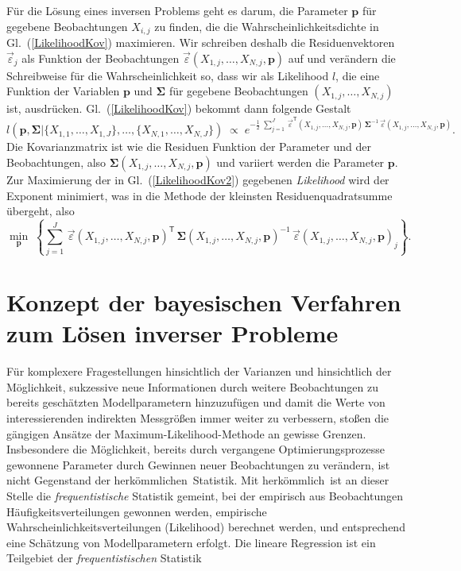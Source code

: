 Für die Lösung eines inversen Problems geht es darum, die Parameter $\mathbf{p}$
für gegebene Beobachtungen $X_{i,j}$ zu finden, die die Wahrscheinlichkeitsdichte
in Gl.~(\ref{LikelihoodKov}) maximieren. Wir schreiben deshalb die Residuenvektoren $\vec \varepsilon_j$ als Funktion
der Beobachtungen $\vec \varepsilon(X_{1,j},\dots,X_{N,j},\mathbf{p})$ auf und verändern die Schreibweise
für die Wahrscheinlichkeit so, dass wir als Likelihood $l$, die eine Funktion der
Variablen $\mathbf{p}$ und $\boldsymbol{\Sigma}$ für gegebene Beobachtungen $(X_{1,j},\dots,X_{N,j})$ ist,
ausdrücken. Gl.~(\ref{LikelihoodKov}) bekommt dann folgende Gestalt
\begin{equation}
l(\mathbf{p}, \boldsymbol{\Sigma} | \{X_{1,1}, \dots, X_{1,J}\}, \dots, \{X_{N,1}, \dots, X_{N,J}\} ) \; \propto \; 
e^{-\frac{1}{2} \; \sum\limits_{j=1}^J \, \vec \varepsilon^\mathsf{T}(X_{1,j},\dots,X_{N,j},\mathbf{p}) \, \boldsymbol{\Sigma}^{-1} \, \vec \varepsilon(X_{1,j},\dots,X_{N,j},\mathbf{p}) } .
\label{LikelihoodKov2}
\end{equation}
Die Kovarianzmatrix ist wie die Residuen Funktion der Parameter und der Beobachtungen,
also $\boldsymbol{\Sigma}(X_{1,j},\dots,X_{N,j},\mathbf{p})$ und
variiert werden die Parameter $\mathbf{p}$.
Zur Maximierung der in Gl.~(\ref{LikelihoodKov2}) gegebenen 
\textsl{Likelihood} wird der Exponent minimiert, was in die Methode der kleinsten Residuenquadratsumme
übergeht, also
\begin{equation}
\min_{\mathbf{p}} \; \left\{ 
 \sum\limits_{j=1}^J \, \vec \varepsilon(X_{1,j},\dots,X_{N,j},\mathbf{p})^\mathsf{T} \, 
\boldsymbol{\Sigma}(X_{1,j},\dots,X_{N,j},\mathbf{p})^{-1} \, \vec \varepsilon(X_{1,j},\dots,X_{N,j},\mathbf{p})_j \right\} .
\label{generalLSmethod}
\end{equation}

\section{Konzept der bayesischen Verfahren zum Lösen inverser Probleme}

Für komplexere Fragestellungen hinsichtlich der Varianzen und hinsichtlich der Möglichkeit,
sukzessive neue Informationen durch weitere Beobachtungen zu bereits geschätzten Modellparametern
hinzuzufügen und damit die Werte von
interessierenden indirekten Messgrößen immer weiter zu verbessern, stoßen die gängigen Ansätze
der Maximum-Likelihood-Methode an gewisse Grenzen. Insbesondere die Möglichkeit, bereits durch
vergangene Optimierungsprozesse gewonnene Parameter durch Gewinnen neuer Beobachtungen zu verändern,
ist nicht Gegenstand der \glqq herkömmlichen\grqq ~Statistik. Mit \glqq herkömmlich\grqq ~ist
an dieser Stelle die \textsl{frequentistische} Statistik gemeint, bei der empirisch aus
Beobachtungen Häufigkeitsverteilungen gewonnen werden, empirische Wahrscheinlichkeitsverteilungen
(Likelihood) berechnet werden, und entsprechend eine Schätzung von Modellparametern erfolgt.
Die lineare Regression ist ein Teilgebiet der \textsl{frequentistischen} Statistik


